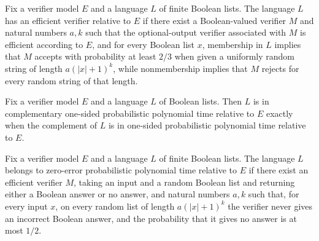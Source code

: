 \begin{definition}
\label{Randomized.InRP}
\leanok
{}
Fix a verifier model $E$ and a language $L$ of finite Boolean lists. The language $L$
has an efficient verifier relative to $E$ if there exist a Boolean-valued verifier $M$
and natural numbers $a,k$ such that the optional-output verifier associated with $M$ is
efficient according to $E$, and for every Boolean list $x$, membership in $L$ implies
that $M$ accepts with probability at least $2/3$ when given a uniformly random string of
length $a(|x|+1)^k$, while nonmembership implies that $M$ rejects
for every random string of that length.
\end{definition}

\begin{definition}
\label{Randomized.InCoRP}
\leanok
{}
Fix a verifier model $E$ and a language $L$ of Boolean lists. Then $L$ is in
complementary one-sided probabilistic polynomial time relative to $E$ exactly when the
complement of $L$ is in one-sided probabilistic polynomial time relative to $E$.
\end{definition}

\begin{definition}
\label{Randomized.InZPP}
\leanok
{}
Fix a verifier model $E$ and a language $L$ of finite Boolean lists. The language $L$
belongs to zero-error probabilistic polynomial time relative to $E$ if there exist an
efficient verifier $M$, taking an input and a random Boolean list and returning either a
Boolean answer or no answer, and natural numbers $a,k$ such that, for every input $x$,
on every random list of length $a(|x|+1)^k$ the verifier never gives an incorrect
Boolean answer, and the probability that it gives no answer is at most $1/2$.
\end{definition}

